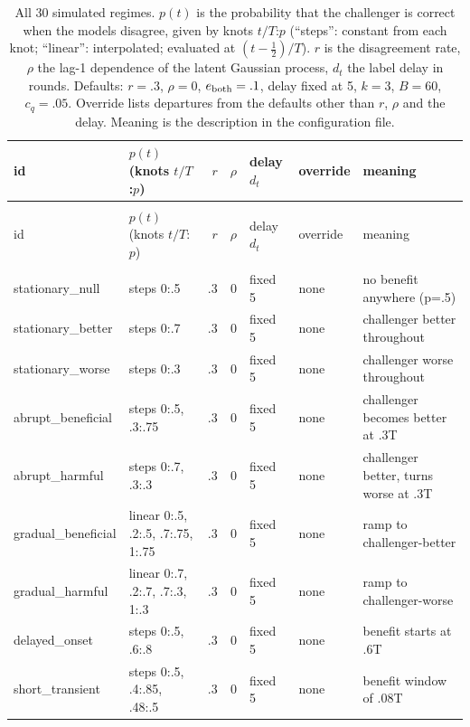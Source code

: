 \begin{longtable}{@{}>{\raggedright\arraybackslash}p{3.3cm}>{\raggedright\arraybackslash}p{2.9cm}rr>{\raggedright\arraybackslash}p{2.4cm}>{\raggedright\arraybackslash}p{1.1cm}>{\raggedright\arraybackslash}p{2.7cm}@{}}
\caption{All 30 simulated regimes. $p(t)$ is the probability that the challenger is correct when the models disagree, given by knots $t/T$:$p$ (``steps'': constant from each knot; ``linear'': interpolated; evaluated at $(t-\tfrac12)/T$). $r$ is the disagreement rate, $\rho$ the lag-1 dependence of the latent Gaussian process, $d_t$ the label delay in rounds. Defaults: $r=.3$, $\rho=0$, $e_{\rm both}=.1$, delay fixed at 5, $k=3$, $B=60$, $c_q=.05$. Override lists departures from the defaults other than $r$, $\rho$ and the delay. Meaning is the description in the configuration file.}\label{tab:regimes_app}\\
\toprule id & $p(t)$ (knots $t/T$:$p$) & $r$ & $\rho$ & delay $d_t$ & override & meaning \\
\midrule
\endfirsthead
\multicolumn{7}{@{}l}{\emph{Table~\thetable{} (continued)}} \\[2pt]
\toprule id & $p(t)$ (knots $t/T$:$p$) & $r$ & $\rho$ & delay $d_t$ & override & meaning \\
\midrule
\endhead
\multicolumn{7}{@{}l}{\emph{24 original regimes} (\texttt{regimes\_v1.json})} \\
stationary\_null & steps 0:.5 & .3 & 0 & fixed 5 & none & no benefit anywhere (p=.5) \\
stationary\_better & steps 0:.7 & .3 & 0 & fixed 5 & none & challenger better throughout \\
stationary\_worse & steps 0:.3 & .3 & 0 & fixed 5 & none & challenger worse throughout \\
abrupt\_beneficial & steps 0:.5, .3:.75 & .3 & 0 & fixed 5 & none & challenger becomes better at .3T \\
abrupt\_harmful & steps 0:.7, .3:.3 & .3 & 0 & fixed 5 & none & challenger better, turns worse at .3T \\
gradual\_beneficial & linear 0:.5, .2:.5, .7:.75, 1:.75 & .3 & 0 & fixed 5 & none & ramp to challenger-better \\
gradual\_harmful & linear 0:.7, .2:.7, .7:.3, 1:.3 & .3 & 0 & fixed 5 & none & ramp to challenger-worse \\
delayed\_onset & steps 0:.5, .6:.8 & .3 & 0 & fixed 5 & none & benefit starts at .6T \\
short\_transient & steps 0:.5, .4:.85, .48:.5 & .3 & 0 & fixed 5 & none & benefit window of .08T \\

\end{longtable}
